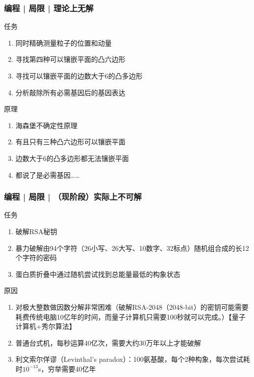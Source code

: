 \begin{frame}
  \frametitle{编程 | 局限 | 理论上无解}
  \begin{block}{任务}
    \begin{enumerate}
      \item<1-> 同时精确测量粒子的位置和动量
      \item<2-> 寻找第四种可以镶嵌平面的凸六边形
      \item<3-> 寻找可以镶嵌平面的边数大于6的凸多边形
      \item<4-> 分析敲除所有必需基因后的基因表达
    \end{enumerate}
  \end{block}
  \begin{block}{原理}
    \begin{enumerate}
      \item<1-> 海森堡不确定性原理
      \item<2-> 有且只有三种凸六边形可以镶嵌平面
      \item<3-> 边数大于6的凸多边形都无法镶嵌平面
      \item<4-> 都说了是必需基因……
    \end{enumerate}
  \end{block}
\end{frame}

\begin{frame}
  \frametitle{编程 | 局限 | （现阶段）实际上不可解}
  \begin{block}{任务}
    \begin{enumerate}
      \item<1-> 破解RSA秘钥
      \item<2-> 暴力破解由94个字符（26小写、26大写、10数字、32标点）随机组合成的长12个字符的密码
      \item<3-> 蛋白质折叠中通过随机尝试找到总能量最低的构象状态
    \end{enumerate}
  \end{block}
  \begin{block}{原因}
    \begin{enumerate}
      \item<1-> 对极大整数做因数分解非常困难（破解RSA-2048（2048-bit）的密钥可能需要耗费传统电脑10亿年的时间，而量子计算机只需要100秒就可以完成。）【量子计算机+秀尔算法】
      \item<2-> 普通台式机，每秒运算40亿次，需要大约30万年以上才能破解
      \item<3-> 利文索尔佯谬（Levinthal's paradox）：100氨基酸，每个2种构象，每次尝试耗时$10^{-13}$s，穷举需要40亿年
    \end{enumerate}
  \end{block}
\end{frame}

